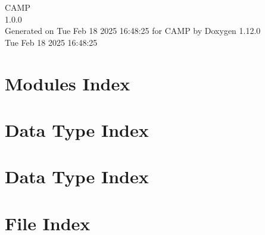 \documentclass[twoside]{book}
\newcommand{\+}{\discretionary{\mbox{\scriptsize$\hookleftarrow$}}{}{}}
\newcommand{\clearemptydoublepage}{%
    \newpage{\pagestyle{empty}\cleardoublepage}%
  }
\begin{document}
  \raggedbottom
    \hypersetup{pageanchor=false,
                bookmarksnumbered=true,
                pdfencoding=unicode
               }
  \begin{titlepage}
  \vspace*{7cm}
  \begin{center}%
  {\Large CAMP}\\
  [1ex]\large 1.\+0.\+0 \\
  \vspace*{1cm}
  {\large Generated on Tue Feb 18 2025 16\+:48\+:25 for CAMP by Doxygen 1.12.0}\\
    \vspace*{0.5cm}
    {\small Tue Feb 18 2025 16:48:25}
  \end{center}
  \end{titlepage}
  \clearemptydoublepage
  \tableofcontents
  \clearemptydoublepage
  \hypersetup{pageanchor=true}















\chapter{Modules Index}

\chapter{Data Type Index}

\chapter{Data Type Index}

\chapter{File Index}

\end{document}
